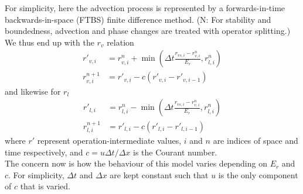 \documentclass[11pt]{article}
\begin{document}
For simplicity, here the advection process is represented by a forwards-in-time backwards-in-space (FTBS) finite difference method. (N: For stability and boundedness, advection and phase changes are treated with operator splitting.) We thus end up with the $r_v$ relation
\begin{align} \label{eq:4}
r'_{v,i} &= r^n_{v,i} + \min\left(\Delta t\frac{r_{vs,i} - r^n_{v,i}}{E_r},r^n_{l,i}\right) \\ \label{eq:5}
r^{n+1}_{v,i} &= r'_{v,i} - c\left(r'_{v,i} - r'_{v,i-1}\right)
\end{align}
and likewise for $r_l$
\begin{align} \label{eq:6}
r'_{l,i} &= r^n_{l,i} - \min\left(\Delta t\frac{r_{vs,i} - r^n_{v,i}}{E_r},r^n_{l,i}\right) \\ \label{eq:7}
r^{n+1}_{l,i} &= r'_{l,i} - c\left(r'_{l,i} - r'_{l,i-1}\right)
\end{align}
where $r'$ represent operation-intermediate values, $i$ and $n$ are indices of space and time respectively, and $c=u \Delta t/\Delta x$ is the Courant number. \\
The concern now is how the behaviour of this model varies depending on $E_r$ and $c$. For simplicity, $\Delta t$ and $\Delta x$ are kept constant such that $u$ is the only component of $c$ that is varied.
\end{document}
